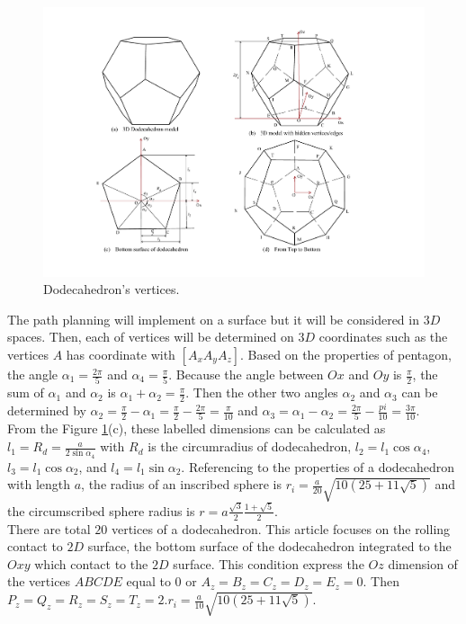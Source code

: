\begin{figure}[h]
\centering
	\includegraphics[width=1\textwidth]{image/dodecahedron2.pdf}
	\caption{Dodecahedron's vertices.}
	\label{fig:dodecahedron2}
\end{figure}

The path planning will implement on a surface but it will be considered in $3D$ spaces. Then, each of vertices will be determined on $3D$ coordinates such as the vertices $A$ has coordinate with $[A_x A_y A_z]$. Based on the properties of pentagon, the angle $\alpha_1=\frac{2\pi}{5}$ and $\alpha_4=\frac{\pi}{5}$. Because the angle between $Ox$ and $Oy$ is $\frac{\pi}{2}$, the sum of $\alpha_1$ and $\alpha_2$ is $\alpha_1 + \alpha_2 = \frac{\pi}{2}$. Then the other two angles $\alpha_2$ and $\alpha_3$ can be determined by $\alpha_2 = \frac{\pi}{2}-\alpha_1 = \frac{\pi}{2}-\frac{2\pi}{5} = \frac{\pi}{10}$ and $\alpha_3 = \alpha_1-\alpha_2 = \frac{2\pi}{5}-\frac{pi}{10} = \frac{3\pi}{10}$.\\

From the Figure \ref{fig:dodecahedron2}(c), these labelled dimensions can be calculated as $l_1 = R_d = \frac{a}{2\sin{\alpha_4}}$ with $R_d$ is the circumradius of dodecahedron, $l_2 = l_1\cos{\alpha_4}$, $l_3 = l_1\cos{\alpha_2}$, and $l_4 = l_1\sin{\alpha_2}$. Referencing to the properties of a dodecahedron with length $a$, the radius of an inscribed sphere is $r_i = \frac{a}{20}\sqrt{10(25+11\sqrt{5})}$ and the circumscribed sphere radius is $r = a\frac{\sqrt{3}}{2}\frac{1+\sqrt{5}}{2}$.\\

There are total $20$ vertices of a dodecahedron. This article focuses on the rolling contact to $2D$ surface, the bottom surface of the dodecahedron integrated to the $Oxy$ which contact to the $2D$ surface. This condition express the $Oz$ dimension of the vertices $ABCDE$ equal to $0$ or $A_z = B_z = C_z = D_z = E_z = 0$. Then $P_z = Q_z = R_z = S_z = T_z = 2.r_i = \frac{a}{10}\sqrt{10(25+11\sqrt{5})}$.\\

